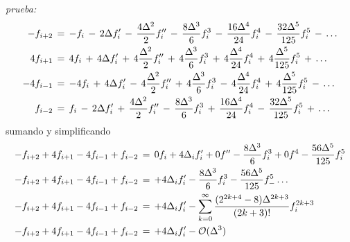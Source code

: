 \documentclass[9pt,technote,twoside,letterpaper,onecolumn]{IEEEtran}
\begin{document}
\emph{prueba:}
{\tiny
  \begin{align}
    -f_{i+2}&\,=\,-f_i
              \,-\,2\Delta f'_i
              \,-\,\frac{4\Delta^2}{2}f''_i
              \,-\,\frac{8\Delta^3}{6}f^3_i
              \,-\,\frac{16\Delta^4}{24}f^4_i
              \,-\,\frac{32\Delta^5}{125}f^5_i  
              \,-\,\ldots  
              \notag\\
    4f_{i+1}&\,=\,4f_i
              \,+\,4\Delta f'_i
              \,+\,4\frac{\Delta^2}{2}f''_i
              \,+\,4\frac{\Delta^3}{6}f^3_i
              \,+\,4\frac{\Delta^4}{24}f^4_i
              \,+\,4\frac{\Delta^5}{125}f^5_i  
              \,+\,\ldots  
              \notag\\
    -4f_{i-1}&\,=\,-4f_i
               \,+\,4\Delta f'_i
               \,-\,4\frac{\Delta^2}{2}f''_i
               \,+\,4\frac{\Delta^3}{6}f^3_i
               \,-\,4\frac{\Delta^4}{24}f^4_i
               \,+\,4\frac{\Delta^5}{125}f^5_i  
               \,-\,\ldots  
               \notag\\
    f_{i-2}&\,=\,f_i
             \,-\,2\Delta f'_i
             \,+\,\frac{4\Delta^2}{2}f''_i
             \,-\,\frac{8\Delta^3}{6}f^3_i
             \,+\,\frac{16\Delta^4}{24}f^4_i
             \,-\,\frac{32\Delta^5}{125}f^5_i  
             \,+\,\ldots
             \notag
  \end{align}
}
sumando y simplificando 
{\tiny
  \begin{align}
    -f_{i+2}+4f_{i+1}-4f_{i-1}+f_{i-2}\,&=\,0f_i
                                          +4\Delta_if'_i
                                          +0f''
                                          -\frac{8\Delta^3}{6}f^3_i
                                          +0f^4
                                          -\frac{56\Delta^5}{125}f^5_i\notag\\
    -f_{i+2}+4f_{i+1}-4f_{i-1}+f_{i-2}\,&=\,+4\Delta_if'_i
                                          -\frac{8\Delta^3}{6}f^3_i
                                          -\frac{56\Delta^5}{125}f^5_
                                          -\ldots\notag\\
    -f_{i+2}+4f_{i+1}-4f_{i-1}+f_{i-2}\,&=\,+4\Delta_if'_i
                                          -\sum^\infty_{k=0}\frac{(2^{2k+4}-8)\Delta^{2k+3}}{(2k+3)!}f^{2k+3}_i\notag\\
    -f_{i+2}+4f_{i+1}-4f_{i-1}+f_{i-2}\,&=\,+4\Delta_if'_i
                                          -\mathcal{O}(\Delta^3)
  \end{align}
}
\end{document}
